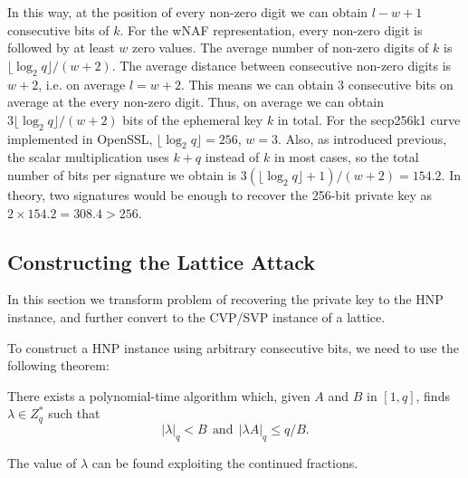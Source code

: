 In this way, at the position of every non-zero digit we can obtain $l - w + 1$ consecutive bits of $k$.
For the wNAF representation, every non-zero digit is followed by at least $w$ zero values.
 The average number of non-zero digits of $k$ is $\lfloor\log_{2}{q}\rfloor /(w+2)$.
 The average distance between consecutive non-zero digits is $w+2$, i.e. on average $l = w + 2$.
 This means we can obtain $3$ consecutive bits on average at the every non-zero digit.
Thus, on average we can obtain $3\lfloor\log_{2}{q}\rfloor /(w+2)$ bits of the ephemeral key $k$ in total.
For the secp256k1 curve implemented in OpenSSL, $\lfloor\log_{2}{q}\rfloor = 256$, $w = 3$.
 Also, as introduced previous, the scalar multiplication uses $k+q$ instead of $k$ in most cases,
  so the total number of bits per signature we obtain is $3(\lfloor\log_{2}{q}\rfloor +1)/(w+2) = 154.2$.
In theory, two signatures would be enough to recover the 256-bit private key as $2\times 154.2 = 308.4 > 256$.


%


\subsection{Constructing the Lattice Attack}
\label{data_proc2}
In this section we transform problem of recovering the private key to the HNP instance, and further convert to the CVP/SVP instance of a lattice.

To construct a HNP instance using arbitrary consecutive bits, we need to use the following theorem\cite{Nguyen2002}:
\begin{theorem}
 \label{theorem1}
There exists a polynomial-time algorithm which, given $A$ and $B$ in $[1, q]$, finds $\lambda \in Z^{*}_{q}$ such that
$$
|\lambda |_q < B  \ \  \text{and} \ \  |\lambda A|_q \leq q/B .
$$
\end{theorem}
The value of $\lambda$ can be found exploiting the continued fractions.

